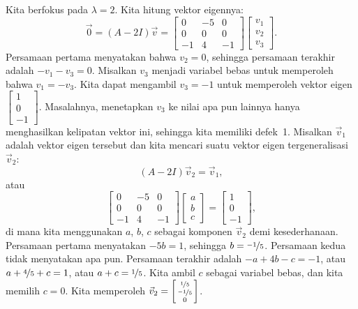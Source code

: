 \begin{example}
Kita berfokus pada $\lambda = 2$.  Kita hitung vektor eigennya:
\begin{equation*}
\vec{0} =
(A - 2 I) \vec{v}
=
\begin{bmatrix}
0 & -5 & 0 \\
0 & 0 & 0 \\
-1 & 4 & -1
\end{bmatrix}
\begin{bmatrix}
v_1 \\ v_2 \\ v_3
\end{bmatrix}
.
\end{equation*}
Persamaan pertama menyatakan bahwa $v_2 = 0$, sehingga persamaan terakhir
adalah $-v_1 -v_3 = 0$.  Misalkan $v_3$ menjadi variabel bebas untuk memperoleh
bahwa $v_1 = -v_3$.  Kita dapat mengambil $v_3 = -1$ untuk memperoleh vektor eigen
$\left[ \begin{smallmatrix} 1 \\ 0 \\ -1 \end{smallmatrix} \right]$.
Masalahnya, menetapkan $v_3$ ke nilai apa pun lainnya hanya menghasilkan kelipatan
vektor ini, sehingga kita memiliki defek~1.
Misalkan $\vec{v}_1$ adalah vektor eigen tersebut dan kita mencari
suatu vektor eigen tergeneralisasi $\vec{v}_2$:
\begin{equation*}
(A - 2 I) \vec{v}_2 = \vec{v}_1 , 
\end{equation*}
atau
\begin{equation*}
\begin{bmatrix}
0 & -5 & 0 \\
0 & 0 & 0 \\
-1 & 4 & -1
\end{bmatrix}
\begin{bmatrix}
a \\ b \\ c
\end{bmatrix}
=
\begin{bmatrix}
1 \\ 0 \\ -1
\end{bmatrix} ,
\end{equation*}
di mana kita menggunakan $a$, $b$, $c$ sebagai komponen $\vec{v}_2$ demi kesederhanaan.
Persamaan pertama menyatakan $-5b = 1$, sehingga $b = \nicefrac{-1}{5}$.  Persamaan
kedua tidak menyatakan apa pun.
Persamaan terakhir adalah $-a + 4b - c = -1$, atau
$a + \nicefrac{4}{5} + c = 1$, atau
$a + c = \nicefrac{1}{5}$.  Kita ambil $c$ sebagai variabel bebas, dan kita
memilih $c=0$.  Kita memperoleh
$\vec{v}_2 = \left[ \begin{smallmatrix} \nicefrac{1}{5} \\ \nicefrac{-1}{5}
\\ 0 \end{smallmatrix} \right]$.


\end{example}
